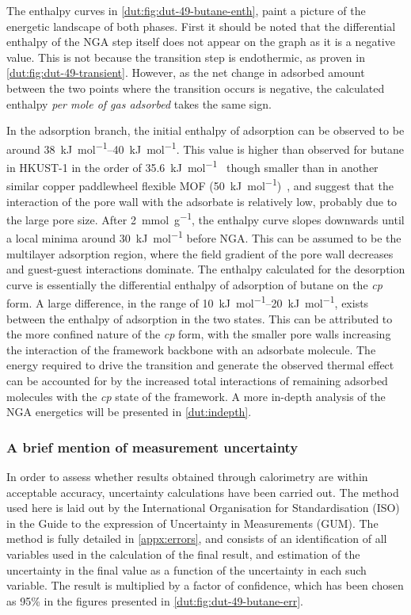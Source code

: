 The enthalpy curves in \autoref{dut:fig:dut-49-butane-enth},
paint a picture of the energetic landscape of both phases.
First it should be noted that the differential enthalpy of
the \gls{NGA} step itself does not appear on the graph as it is a
negative value. This is not because the transition step is 
endothermic, as proven in \autoref{dut:fig:dut-49-transient}. 
However, as the net change in adsorbed amount between the two
points where the transition occurs is negative, the calculated
enthalpy \textit{per mole of gas adsorbed} takes the same sign.

In the adsorption branch, the initial enthalpy of adsorption 
can be observed to be around \SIrange{38}{40}{\kilo\joule\per\mol}.
This value is higher than observed for butane in HKUST-1 in the 
order of \SI{35.6}{\kilo\joule\per\mol}~\cite{farrussengHeatsAdsorptionSeven2009} 
though smaller than in another similar copper paddlewheel flexible \gls{MOF} 
(\SI{50}{\kilo\joule\per\mol})~\cite{langeStructuralFlexibilityCopperbased2014},
and suggest that the interaction of the pore wall with the adsorbate is 
relatively low, probably due to the large pore size. 
After \SI{2}{\milli\mol\per\gram}, the enthalpy
curve slopes downwards until a local minima around 
\SI{30}{\kilo\joule\per\mol} before \gls{NGA}. 
This can be assumed to be the multilayer adsorption region,
where the field gradient of the pore wall decreases and guest-guest 
interactions dominate.
The enthalpy calculated for the desorption curve is essentially the 
differential enthalpy of adsorption of butane on the \textit{cp} form.
A large difference, in the range of 
\SIrange{10}{20}{\kilo\joule\per\mol}, exists
between the enthalpy of adsorption in the two states. This can be 
attributed to the more confined nature of the \textit{cp} form, with the
smaller pore walls increasing the interaction of the framework backbone
with an adsorbate molecule. The energy required to drive the 
transition and generate the observed thermal effect can be accounted 
for by the increased total interactions of remaining adsorbed 
molecules with the \textit{cp} state of the framework.
A more in-depth analysis of the \gls{NGA} energetics will be presented 
in \autoref{dut:indepth}.

\subsubsection{A brief mention of measurement uncertainty}

In order to assess whether results obtained through calorimetry
are within acceptable accuracy, uncertainty calculations have been
carried out. The method used here is laid out by the International 
Organisation for Standardisation (ISO) in the Guide to the expression
of Uncertainty in Measurements (GUM). The method is fully detailed 
in \autoref{appx:errors}, and consists of an identification of 
all variables used in the calculation of the final result, and 
estimation of the uncertainty in the final value as a function of
the uncertainty in each such variable. The result is multiplied
by a factor of confidence, which has been chosen as 95\% in the 
figures presented in \autoref{dut:fig:dut-49-butane-err}.


